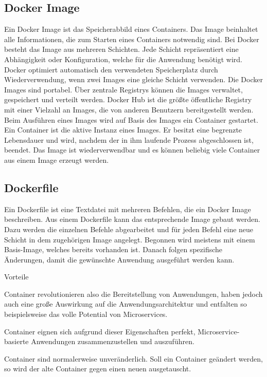 \subsection{Docker Image}

Ein Docker Image ist das Speicherabbild eines Containers. Das Image beinhaltet alle Informationen, die zum Starten eines Containers notwendig sind.  Bei Docker besteht das Image aus mehreren Schichten. Jede Schicht repräsentiert eine Abhängigkeit oder Konfiguration, welche für die Anwendung benötigt wird. Docker optimiert automatisch den verwendeten Speicherplatz durch Wiederverwendung, wenn zwei Images eine gleiche Schicht verwenden. Die Docker Images sind portabel. Über zentrale Registrys können die Images verwaltet, gespeichert und verteilt werden. Docker Hub ist die größte öffentliche Registry mit einer Vielzahl an Images, die von anderen Benutzern bereitgestellt werden. Beim Ausführen eines Images wird auf Basis des Images ein Container gestartet. Ein Container ist die aktive Instanz eines Images. Er besitzt eine begrenzte Lebensdauer und wird, nachdem der in ihm laufende Prozess abgeschlossen ist, beendet. Das Image ist wiederverwendbar und es können beliebig viele Container aus einem Image erzeugt werden.

\subsection{Dockerfile}

Ein Dockerfile ist eine Textdatei mit mehreren Befehlen, die ein Docker Image beschreiben. Aus einem Dockerfile kann das entsprechende Image gebaut werden. Dazu werden die einzelnen Befehle abgearbeitet und für jeden Befehl eine neue Schicht in dem zugehörigen Image angelegt. Begonnen wird meistens mit einem Basis-Image, welches bereits vorhanden ist. Danach folgen spezifische Änderungen, damit die gewünschte Anwendung ausgeführt werden kann.


{Vorteile}

Container revolutionieren also die Bereitstellung von Anwendungen, haben jedoch auch eine große Auswirkung auf die Anwendungsarchitektur und entfalten so beispielsweise das volle Potential von Microservices.

Container eignen sich aufgrund dieser Eigenschaften perfekt, Microservice-basierte Anwendungen zusammenzustellen und auszuführen. 

Container sind normalerweise unveränderlich. Soll ein Container geändert werden, so wird der alte Container gegen einen neuen ausgetauscht.

